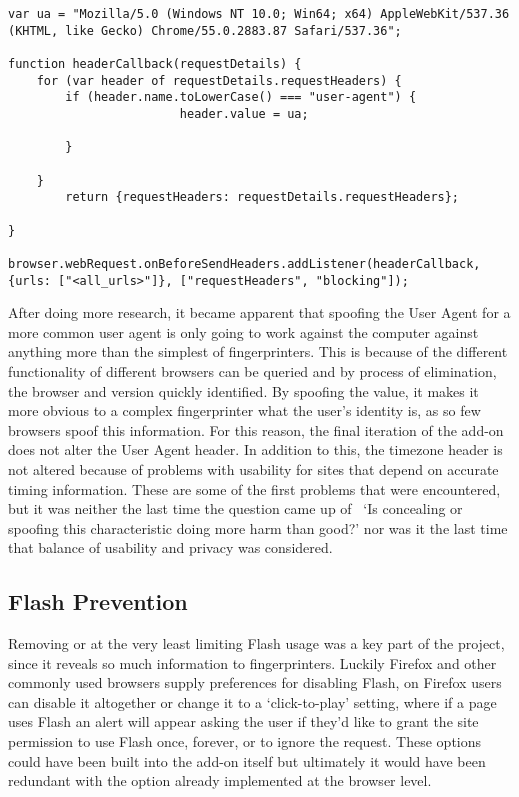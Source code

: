 \begin{lstlisting}[caption={The callback used to change the User Agent header}, label={lst:user-agent}]
var ua = "Mozilla/5.0 (Windows NT 10.0; Win64; x64) AppleWebKit/537.36 (KHTML, like Gecko) Chrome/55.0.2883.87 Safari/537.36";

function headerCallback(requestDetails) {
    for (var header of requestDetails.requestHeaders) {
        if (header.name.toLowerCase() === "user-agent") {
                        header.value = ua;
                                
        }
            
    }
        return {requestHeaders: requestDetails.requestHeaders};

}

browser.webRequest.onBeforeSendHeaders.addListener(headerCallback, {urls: ["<all_urls>"]}, ["requestHeaders", "blocking"]);
\end{lstlisting}

After doing more research, it became apparent that spoofing the User Agent for a more common user agent is only going to work against the computer against anything more than the simplest of fingerprinters.
This is because of the different functionality of different browsers can be queried and by process of elimination, the browser and version quickly identified.
By spoofing the value, it makes it more obvious to a complex fingerprinter what the user's identity is, as so few browsers spoof this information.
For this reason, the final iteration of the add-on does not alter the User Agent header.
In addition to this, the timezone header is not altered because of problems with usability for sites that depend on accurate timing information.
These are some of the first problems that were encountered, but it was neither the last time the question came up of ~`Is concealing or spoofing this characteristic doing more harm than good?' nor was it the last time that balance of usability and privacy was considered.

\subsection{Flash Prevention}

Removing or at the very least limiting Flash usage was a key part of the project, since it reveals so much information to fingerprinters.
Luckily Firefox and other commonly used browsers supply preferences for disabling Flash, on Firefox users can disable it altogether or change it to a `click-to-play' setting, where if a page uses Flash an alert will appear asking the user if they'd like to grant the site permission to use Flash once, forever, or to ignore the request.
These options could have been built into the add-on itself but ultimately it would have been redundant with the option already implemented at the browser level.

